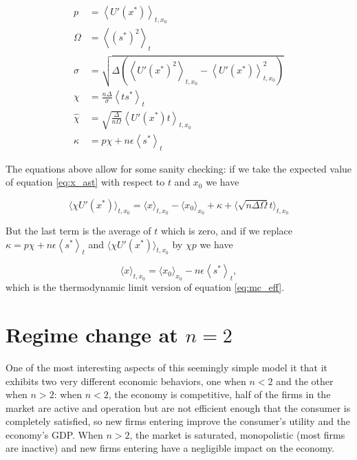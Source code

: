 \begin{align}
  p & = \left \langle U'(x^*) \right \rangle_{t,x_0} \label{eq:saddlep} \\
\Omega & = \left\langle (s^*)^2 \right\rangle_t \label{eq:saddleomega}\\
\sigma & = \sqrt{\Delta
    \left(\left \langle U'(x^*)^2 \right \rangle_{t,x_0} - \left
        \langle U'(x^*) \right \rangle_{t,x_0}^2 \right)} \label{eq:saddlesigma}\\
    \chi & = \frac{n\Delta}{\sigma} \left \langle t s^* \right
    \rangle_t \label{eq:saddlechi}\\
\hat{\chi} & = \sqrt{\frac{\Delta}{n\Omega}} \left \langle U'(x^*) t
\right \rangle_{t,x_0} \label{eq:saddlehatchi}\\
  \kappa & = p \chi + n\epsilon \left \langle s^* \right \rangle_t \label{eq:saddlekappa}
\end{align}

The equations above allow for some sanity checking: if we take the expected value of equation \eqref{eq:x_ast} with respect to $t$ and $x_0$ we have

\begin{equation}
  \langle \chi U'(x^\ast) \rangle_{t, x_0} = \langle x \rangle_{t, x_0} - \langle x_0 \rangle_{x_0} + \kappa + \langle \sqrt{n\Delta\Omega}t \rangle_{t, x_0}
\end{equation}

But the last term is the average of $t$ which is zero, and if we replace $\kappa = p \chi + n\epsilon \left \langle s^* \right \rangle_t$ and $\langle \chi U'(x^\ast) \rangle_{t, x_0}$ by $\chi p$ we have

\begin{equation}
    \langle x \rangle_{t, x_0} =  \langle x_0 \rangle_{x_0} - n\epsilon  \left \langle s^* \right \rangle_t,
\end{equation}
which is the thermodynamic limit version of equation \ref{eq:mc_eff}. 


\section{Regime change at $n=2$}

One of the most interesting aspects of this seemingly simple model it that it exhibits two very different economic behaviors, one when $n<2$ and the other when $n>2$: when $n < 2$, the economy is competitive, half of the firms in the market are active and operation but are not efficient enough that the consumer is completely satisfied, so new firms entering improve the consumer's utility and the economy's GDP. When $n > 2$, the market is saturated, monopolistic (most firms are inactive) and new firms entering have a negligible impact on the economy.

